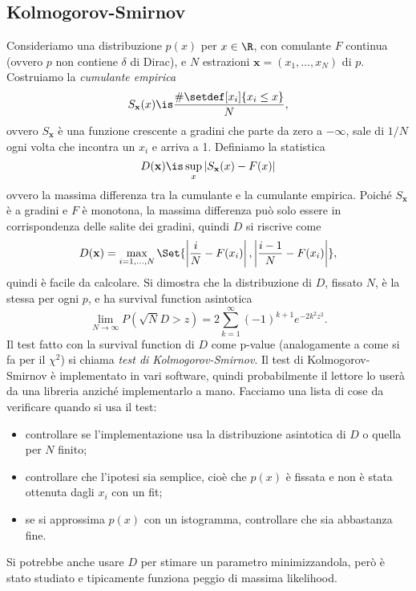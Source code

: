 \subsection{Kolmogorov-Smirnov}

Consideriamo una distribuzione $p(x)$ per $x\in\R$, con comulante $F$ continua
(ovvero $p$ non contiene $\delta$ di Dirac), e $N$ estrazioni
$\mathbf x = (x_1, \dots, x_N)$ di $p$. Costruiamo la \emph{cumulante empirica} 
\begin{equation*}
	S_{\mathbf x}(x)
	\is \frac {\#\setdef[x_i]{x_i\le x}} N,
\end{equation*}
ovvero $S_{\mathbf x}$ è una funzione crescente a gradini che parte da zero a
$-\infty$, sale di $1/N$ ogni volta che incontra un $x_i$ e arriva a 1.
Definiamo la statistica
\begin{equation*}
	D(\mathbf x)
	\is \sup_x|S_\mathbf x(x)-F(x)|
\end{equation*}
ovvero la massima differenza tra la cumulante e la cumulante empirica. Poiché
$S_{\mathbf x}$ è a gradini e $F$ è monotona, la massima differenza può solo
essere in corrispondenza delle salite dei gradini, quindi $D$ si riscrive come
\begin{equation*}
	D(\mathbf x) = \max_{i=1,\dotsc,N}
    \Set{\left|\frac iN-F(x_i)\right|, \left|\frac{i-1}N-F(x_i)\right|},
\end{equation*}
quindi è facile da calcolare.
Si dimostra che la distribuzione di $D$, fissato $N$, è la stessa per ogni $p$,
e ha survival function asintotica
\begin{equation*}
	\lim_{N\to\infty} P(\sqrt N D>z)
	= 2 \sum_{k=1}^\infty (-1)^{k+1} e^{-2k^2z^2}.
\end{equation*}
Il test fatto con la survival function di $D$ come p-value (analogamente a come
si fa per il $\chi^2$) si chiama \emph{test di Kolmogorov-Smirnov}.
Il test di Kolmogorov-Smirnov è implementato in vari software, quindi
probabilmente il lettore lo userà da una libreria anziché implementarlo a mano.
Facciamo una lista di cose da verificare quando si usa il test:
\begin{itemize}
	\item controllare se l'implementazione usa la distribuzione asintotica di $D$ o quella per $N$ finito;
	\item controllare che l'ipotesi sia semplice,
	cioè che $p(x)$ è fissata e non è stata ottenuta dagli $x_i$ con un fit;
	\item se si approssima $p(x)$ con un istogramma, controllare che sia abbastanza fine.
\end{itemize}
Si potrebbe anche usare $D$ per stimare un parametro minimizzandola,
però è stato studiato e tipicamente funziona peggio di massima likelihood.
